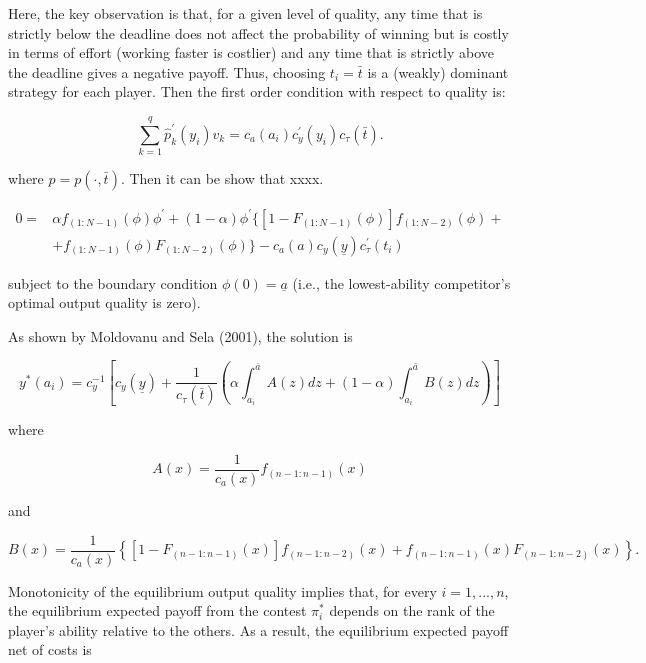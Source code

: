 \documentclass[10pt, titlepage]{article}
\newcommand\deadline{\bar{t}}
\newcommand\target{\underline{y}}
\newcommand\ctime{c_{\tau}}
\newcommand\cscore{c_{y}}
\newcommand\cability{c_{a}}
\newcommand\lotype{\underline{a}}
\newcommand\hitype{\bar{a}}
\begin{document}
Here, the key observation is that, for a given level of quality, any
time that is strictly below the deadline does not affect the probability
of winning but is costly in terms of effort (working faster is costlier)
and any time that is strictly above the deadline gives a negative
payoff. Thus, choosing \(t_i=\deadline\) is a (weakly) dominant strategy
for each player. Then the first order condition with respect to quality
is:

\[
    \sum_{k=1}^{q} \hat p^{\prime}_{k}(y_i) v_k = \cability(a_i) \cscore^\prime(y_i) \ctime(\deadline).
\]

where \(\hat p = p(\cdot, \deadline).\) Then it can be show that xxxx.

\begin{align}
0 = & \alpha f_{(1:N-1)}(\phi) \phi^{\prime} 
    + (1-\alpha)\phi^{\prime}\{[1 - F_{(1:N-1)}(\phi)]f_{(1:N-2)}(\phi) + \nonumber\\
    & + f_{(1:N-1)}(\phi) F_{(1:N-2)}(\phi)\} 
    - c_{a}(a) c_{y}(\target) \ctime^{\prime}(t_i)
\end{align}

subject to the boundary condition \(\phi(0) = \lotype\) (i.e., the
lowest-ability competitor's optimal output quality is zero).

As shown by Moldovanu and Sela (2001), the solution is

\begin{equation} \label{ystar}
y^*(a_i) = 
    \cscore^{-1}
    \left[\cscore(\target) 
    + \frac{1}{\ctime(\deadline)}
    \left(\alpha \int_{a_i}^{\hitype} A(z) dz
      + (1-\alpha) \int_{a_i}^{\hitype} B(z)  dz
    \right)
    \right]
\end{equation}

where

\begin{equation}
  A(x) = \frac{1}{c_{a}(x)} f_{(n-1:n-1)}(x)
\end{equation}

and

\begin{equation}
  B(x) = \frac{1}{c_{a}(x)} \left\{
      \left[1- F_{(n-1:n-1)}(x)\right]f_{(n-1:n-2)}(x)
      + f_{(n-1:n-1)}(x) F_{(n-1:n-2)}(x)
    \right\}.
\end{equation}

Monotonicity of the equilibrium output quality implies that, for every
\(i=1, ..., n\), the equilibrium expected payoff from the contest
\(\pi_i^*\) depends on the rank of the player's ability relative to the
others. As a result, the equilibrium expected payoff net of costs is
\end{document}
